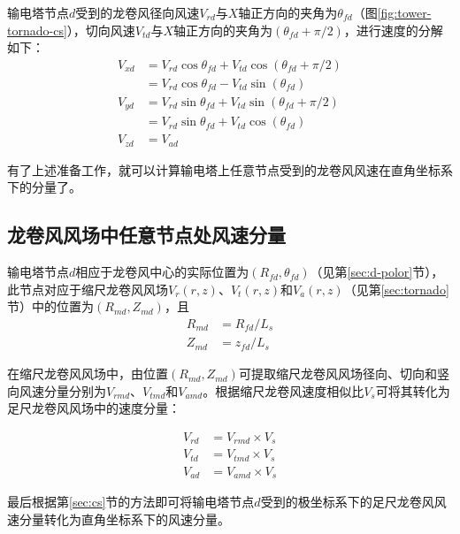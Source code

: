 输电塔节点$d$受到的龙卷风径向风速$V_{rd}$与$X$轴正方向的夹角为$\theta_{fd}$（图\ref{fig:tower-tornado-cs}），切向风速$V_{td}$与$X$轴正方向的夹角为$(\theta_{fd}+\pi/2)$，进行速度的分解如下：
\begin{equation}
\begin{split}
  V_{xd} & = V_{rd} \cos\theta_{fd} + V_{td} \cos(\theta_{fd}+\pi/2) \\
         & = V_{rd} \cos\theta_{fd} - V_{td} \sin(\theta_{fd}) \\
  V_{yd} & = V_{rd} \sin\theta_{fd} + V_{td} \sin(\theta_{fd}+\pi/2) \\
         & = V_{rd} \sin\theta_{fd} + V_{td} \cos(\theta_{fd}) \\   
  V_{zd} & = V_{ad}  
\end{split}
\end{equation}

有了上述准备工作，就可以计算输电塔上任意节点受到的龙卷风风速在直角坐标系下的分量了。

\subsection{龙卷风风场中任意节点处风速分量}
输电塔节点$d$相应于龙卷风中心的实际位置为$(R_{fd}, \theta_{fd})$（见第\ref{sec:d-polor}节），此节点对应于缩尺龙卷风风场$V_r(r,z)$、$V_t(r,z)$和$V_a(r,z)$（见第\ref{sec:tornado}节）中的位置为$(R_{md}, Z_{md})$，且
\begin{equation}
\begin{split}
  R_{md} & = R_{fd} / L_s \\
  Z_{md} & = z_{fd} / L_s
\end{split}
\end{equation}

在缩尺龙卷风风场中，由位置$(R_{md}, Z_{md})$可提取缩尺龙卷风风场径向、切向和竖向风速分量分别为$V_{rmd}$、$V_{tmd}$和$V_{amd}$。根据缩尺龙卷风速度相似比$V_s$可将其转化为足尺龙卷风风场中的速度分量：

\begin{equation}
\begin{split}
  V_{rd} &= V_{rmd} \times V_s \\
  V_{td} &= V_{tmd} \times V_s \\
  V_{ad} &= V_{amd} \times V_s
\end{split}
\end{equation}

最后根据第\ref{sec:cs}节的方法即可将输电塔节点$d$受到的极坐标系下的足尺龙卷风风速分量转化为直角坐标系下的风速分量。


